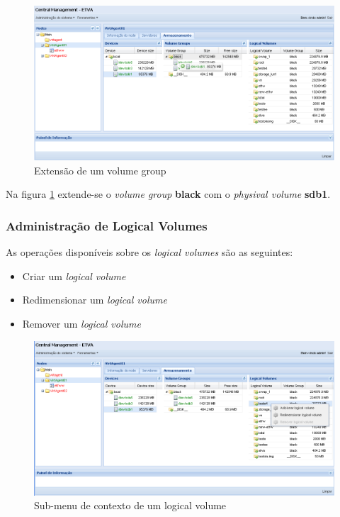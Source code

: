 \begin{figure}[H]
        \begin{center}
        \includegraphics[scale=0.45]{screenshots/storage_vg_extend.png}
        \caption{Extensão de um volume group}
        \label{fig:storage_vg_extend}
        \end{center}
\end{figure}

Na figura \ref{fig:storage_vg_extend} extende-se o \emph{volume group} {\bf black} com o \emph{physival volume} {\bf sdb1}.


\subsubsection{Administração de Logical Volumes}

As operações disponíveis sobre os \emph{logical volumes} são as seguintes:
\begin{itemize}
	\item Criar um \emph{logical volume}
	\item Redimensionar um \emph{logical volume}
	\item Remover um \emph{logical volume}
\end{itemize}

\begin{figure}[H]
        \begin{center}
        \includegraphics[scale=0.45]{screenshots/node_storage_lv_ctx.png}
        \caption{Sub-menu de contexto de um logical volume}
        \label{fig:storage_lv_ctx}
        \end{center}
\end{figure}

